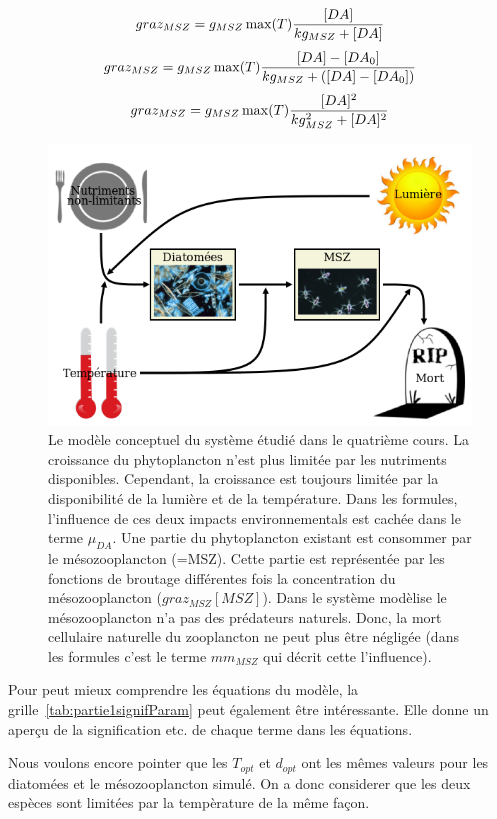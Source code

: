{\begin{equation}
  graz_{MSZ} = g_{MSZ} \max(T) {{[DA]}\over{kg_{MSZ}+[DA]}}
  \label{eq:partie1GrazMic}
\end{equation}
\begin{equation}
  graz_{MSZ} = g_{MSZ} \max(T) {{[DA]-[DA_0]}\over{kg_{MSZ}+([DA]-[DA_0])}}
  \label{eq:partie1GrazMicSeul}
\end{equation}
\begin{equation}
  graz_{MSZ} = g_{MSZ} \max(T) {{[DA]^2}\over{kg_{MSZ}^2+[DA]^2}}
  \label{eq:partie1GrazHol}
\end{equation}

\begin{figure}[h!]
  \includegraphics[width=\textwidth]{partie1/diagrammeConceptuel.png}
  \caption{Le modèle conceptuel du système étudié dans le quatrième cours. La croissance du phytoplancton
n'est plus limitée par les nutriments disponibles. Cependant, la croissance est toujours limitée par la
disponibilité de la lumière et de la température. Dans les formules, l'influence de ces deux impacts
environnementals est cachée dans le terme $\mu_{DA}$. Une partie du phytoplancton existant est consommer
par le mésozooplancton (=MSZ). Cette partie est représentée par les fonctions de broutage
différentes fois la concentration du mésozooplancton ($graz_{MSZ}[MSZ]$). Dans le système modèlise
le mésozooplancton n'a pas des prédateurs naturels. Donc, la mort cellulaire naturelle du zooplancton ne peut
plus être négligée (dans les formules c'est le terme $mm_{MSZ}$ qui décrit cette l'influence).
}
  \label{fig:partie1DiagConcept}
\end{figure}

\par{
Pour peut mieux comprendre les équations du modèle, la grille~\ref{tab:partie1signifParam} peut également
être intéressante. Elle donne un aperçu de la signification etc. de chaque terme dans les équations.
}
\par{
Nous voulons encore pointer que les $T_{opt}$ et $d_{opt}$ ont les mêmes valeurs pour les diatomées et le
mésozooplancton simulé. On a donc considerer que les deux espèces sont limitées par la tempèrature
de la même façon.
}

}
